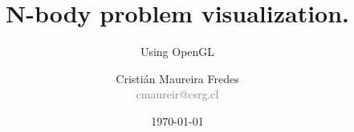 \documentclass{beamer}
\author[C. Maureira]{\large Cristián Maureira Fredes\\\normalsize \textcolor{gray}{cmaureir@csrg.cl}}
\title[n-body visualization]{N-body problem visualization.}
\subtitle{Using OpenGL}
\institute[UTFSM]{Departamento de Informática\\Universidad Técnica Federico Santa María}
\date{\today}
\begin{document}
\begin{frame}[t,plain]
\titlepage
\end{frame}



\begin{frame}[t,plain]
\titlepage
\end{frame}
\end{document}
